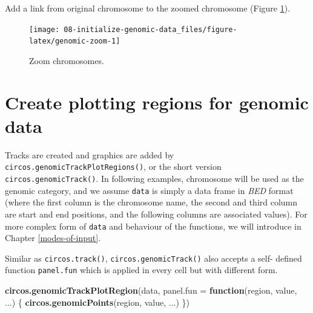 \documentclass[]{book}
\newenvironment{Shaded}{\begin{snugshade}}{\end{snugshade}}
\newcommand{\KeywordTok}[1]{\textcolor[rgb]{0.13,0.29,0.53}{\textbf{#1}}}
\newcommand{\DataTypeTok}[1]{\textcolor[rgb]{0.13,0.29,0.53}{#1}}
\newcommand{\StringTok}[1]{\textcolor[rgb]{0.31,0.60,0.02}{#1}}
\newcommand{\OtherTok}[1]{\textcolor[rgb]{0.56,0.35,0.01}{#1}}
\newcommand{\ControlFlowTok}[1]{\textcolor[rgb]{0.13,0.29,0.53}{\textbf{#1}}}
\newcommand{\NormalTok}[1]{#1}
\begin{document}
Add a link from original chromosome to the zoomed chromosome (Figure
\ref{fig:genomic-zoom}).

\begin{Shaded}
\end{Shaded}

\begin{figure}

{\centering \texttt{[image: 08-initialize-genomic-data\_files/figure-latex/genomic-zoom-1]} 

}

\caption{Zoom chromosomes.}\label{fig:genomic-zoom}
\end{figure}

\chapter{Create plotting regions for genomic
data}\label{genomic-plotting-region}

Tracks are created and graphics are added by
\texttt{circos.genomicTrackPlotRegions()}, or the short version
\texttt{circos.genomicTrack()}. In following examples, chromosome will
be used as the genomic category, and we assume \texttt{data} is simply a
data frame in \emph{BED} format (where the first column is the
chromosome name, the second and third column are start and end
positions, and the following columns are associated values). For more
complex form of \texttt{data} and behaviour of the functions, we will
introduce in Chapter \ref{modes-of-input}.

Similar as \texttt{circos.track()}, \texttt{circos.genomicTrack()} also
accepts a self- defined function \texttt{panel.fun} which is applied in
every cell but with different form.

\begin{Shaded}
\begin{Highlighting}[]
\KeywordTok{circos.genomicTrackPlotRegion}\NormalTok{(data, }\DataTypeTok{panel.fun =} \ControlFlowTok{function}\NormalTok{(region, value, ...) \{}
    \KeywordTok{circos.genomicPoints}\NormalTok{(region, value, ...)}
\NormalTok{\})}
\end{Highlighting}
\end{Shaded}
\end{document}
